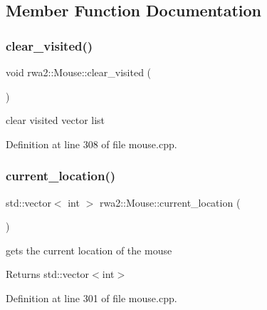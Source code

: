 \subsection{Member Function Documentation}
\mbox{\label{classrwa2_1_1_mouse_a3cb2cdc76a136c392e6a635adcfd2075}} 
\subsubsection{\texorpdfstring{clear\+\_\+visited()}{clear\_visited()}}
{\footnotesize\ttfamily void rwa2\+::\+Mouse\+::clear\+\_\+visited (\begin{DoxyParamCaption}{ }\end{DoxyParamCaption})}



clear visited vector list 



Definition at line 308 of file mouse.\+cpp.

\mbox{\label{classrwa2_1_1_mouse_a6c4e22fb4f67a100c011b634508a5c07}} 
\subsubsection{\texorpdfstring{current\+\_\+location()}{current\_location()}}
{\footnotesize\ttfamily std\+::vector$<$ int $>$ rwa2\+::\+Mouse\+::current\+\_\+location (\begin{DoxyParamCaption}{ }\end{DoxyParamCaption})}



gets the current location of the mouse 

\begin{DoxyReturn}{Returns}
std\+::vector$<$int$>$ 
\end{DoxyReturn}


Definition at line 301 of file mouse.\+cpp.

\mbox{\label{classrwa2_1_1_mouse_ab9f225398c8ec07767559a47f2070755}} 
